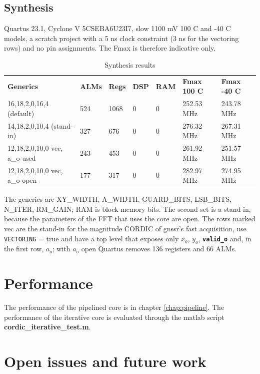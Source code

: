 \documentclass[a4paper, 12pt, notitlepage]{report}
\newcommand{\file}[1]{\textbf{#1}}
\newcommand{\signal}[1]{{\textbf{\tt#1}}}
\begin{document}
\section{Synthesis}
Quartus 23.1, Cyclone V 5CSEBA6U23I7, slow 1100 mV 100 C and -40 C models, a scratch project with a 5 ns
clock constraint (3 ns for the vectoring rows) and no pin assignments. The Fmax is therefore indicative only.
\begin{table}[htbp]
   \center\small
   \begin{tabular}{@{}lllllll@{}}
      \rowcolor{tableheadcolor}\textbf{Generics} & \textbf{ALMs} & \textbf{Regs} & \textbf{DSP} & \textbf{RAM} & \textbf{Fmax 100 C} & \textbf{Fmax -40 C} \\
      16,18,2,0,16,4 (default) & 524 & 1068 & 0 & 0 & 252.53 MHz & 243.78 MHz \\\midrule
      14,18,2,0,10,4 (stand-in) & 327 & 676  & 0 & 0 & 276.32 MHz & 267.31 MHz \\\midrule
      12,18,2,0,10,0 vec, a\_o used & 243 & 453 & 0 & 0 & 261.92 MHz & 251.57 MHz \\\midrule
      12,18,2,0,10,0 vec, a\_o open & 177 & 317 & 0 & 0 & 282.97 MHz & 274.95 MHz \\
      \bottomrule
   \end{tabular}
   \caption{Synthesis results}
   \label{tab:pipe_synth}
\end{table}
The generics are XY\_WIDTH, A\_WIDTH, GUARD\_BITS, LSB\_BITS, N\_ITER, RM\_GAIN; RAM is block memory bits. The second set is a stand-in, because the parameters of the FFT that uses the core are open.
The rows marked vec are the stand-in for the magnitude CORDIC of gnssr's fast acquisition, use \texttt{VECTORING} = true and have a top level that exposes only $x_o$, $y_o$, \signal{valid\_o} and, in the first row,
$a_o$; with $a_o$ open Quartus removes 136 registers and 66 ALMs.

\fussy
\chapter{Performance}
The performance of the pipelined core is in chapter \ref{chap:pipeline}. The performance of the iterative core is evaluated through the matlab script \file{cordic\_iterative\_test.m}.


\chapter{Open issues and future work}
\end{document}
